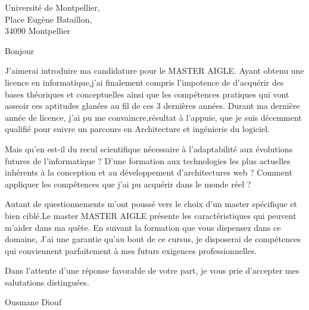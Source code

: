 \documentclass[10pt,a4paper]{letter}
\begin{document}
 
\begin{letter}{Université de Montpellier,\\ Place Eugène Bataillon,\\ 34090 Montpellier} 
\opening{Bonjour} 
 
J'aimerai introduire ma candidature pour le MASTER AIGLE.
Ayant obtenu une licence en informatique,j'ai finalement compris l’impotence de d’acquérir des bases théoriques et conceptuelles ainsi que les compétences pratiques qui vont asseoir ces aptitudes glanées au fil de ces 3 dernières années.
Durant ma dernière année de licence, j'ai pu me convaincre,résultat à l'appuie, que je suis décemment qualifié pour suivre un parcours en Architecture et ingénierie du logiciel.

Mais qu'en est-il du recul scientifique nécessaire à l’adaptabilité aux évolutions futures de l’informatique ? D'une formation aux technologies les plus actuelles inhérents à la conception et au développement d’architectures web ? Comment appliquer les compétences que j'ai pu acquérir dans le monde réel ?

Autant de questionnements m'ont poussé vers le choix d'un master spécifique et bien ciblé.Le master MASTER AIGLE présente les caractéristiques qui peuvent m'aider dans ma quête.
En suivant la formation que vous dispensez dans ce domaine, J'ai une garantie qu'au bout de ce cursus, je disposerai de compétences qui conviennent parfaitement à mes futurs exigences professionnelles.

Dans l'attente d'une réponse favorable de votre part, je vous prie d'accepter mes salutations distinguées.



\closing{Ousmane Diouf} 
\end{letter} 
\end{document}
